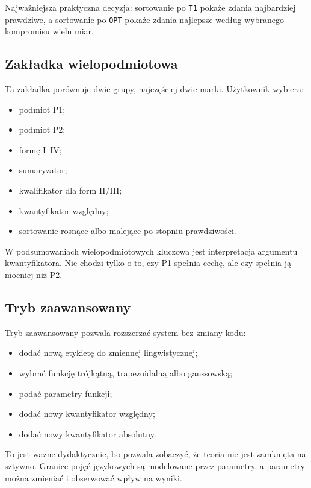 \documentclass[11pt,a4paper]{article}
\newcommand{\code}[1]{\texttt{#1}}
\begin{document}
Najważniejsza praktyczna decyzja: sortowanie po \code{T1} pokaże zdania najbardziej prawdziwe, a sortowanie po \code{OPT} pokaże zdania najlepsze według wybranego kompromisu wielu miar.

\subsection{Zakładka wielopodmiotowa}

Ta zakładka porównuje dwie grupy, najczęściej dwie marki. Użytkownik wybiera:

\begin{itemize}
    \item podmiot P1;
    \item podmiot P2;
    \item formę I--IV;
    \item sumaryzator;
    \item kwalifikator dla form II/III;
    \item kwantyfikator względny;
    \item sortowanie rosnące albo malejące po stopniu prawdziwości.
\end{itemize}

W podsumowaniach wielopodmiotowych kluczowa jest interpretacja argumentu kwantyfikatora. Nie chodzi tylko o to, czy P1 spełnia cechę, ale czy spełnia ją mocniej niż P2.

\subsection{Tryb zaawansowany}

Tryb zaawansowany pozwala rozszerzać system bez zmiany kodu:

\begin{itemize}
    \item dodać nową etykietę do zmiennej lingwistycznej;
    \item wybrać funkcję trójkątną, trapezoidalną albo gaussowską;
    \item podać parametry funkcji;
    \item dodać nowy kwantyfikator względny;
    \item dodać nowy kwantyfikator absolutny.
\end{itemize}

To jest ważne dydaktycznie, bo pozwala zobaczyć, że teoria nie jest zamknięta na sztywno. Granice pojęć językowych są modelowane przez parametry, a parametry można zmieniać i obserwować wpływ na wyniki.
\end{document}
